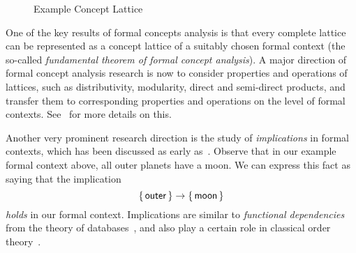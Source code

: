 \begin{figure}[tp]
\begin{center}
  \end{center}
  \caption{Example Concept Lattice}
  \label{fig:example-concept-lattice}
\end{figure}

One of the key results of formal concepts analysis is that every complete lattice can be
represented as a concept lattice of a suitably chosen formal context (the so-called
\emph{fundamental theorem of formal concept analysis}).  A major direction of formal
concept analysis research is now to consider properties and operations of lattices, such
as distributivity, modularity, direct and semi-direct products, and transfer them to
corresponding properties and operations on the level of formal contexts.
See~\cite{fca-book} for more details on this.

Another very prominent research direction is the study of \emph{implications} in formal
contexts, which has been discussed as early as~\cite{fca:Wille:1982}.  Observe that in our
example formal context above, all outer planets have a moon.  We can express this fact as
saying that the implication
\begin{equation*}
  {\ensuremath{\{\, \mathsf{outer} \,\}}} \to {\ensuremath{\{\, \mathsf{moon} \,\}}}
\end{equation*}
\emph{holds} in our formal context.  Implications are similar to \emph{functional
  dependencies} from the theory of databases~\cite{DBLP:books/cs/Maier83}, and also play a
certain role in classical order theory~\cite{Wild1994118}.

